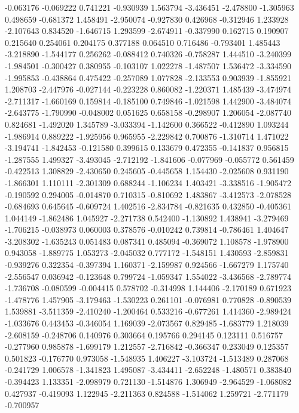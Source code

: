 -0.063176
-0.069222
0.741221
-0.930939
1.563794
-3.436451
-2.478800
-1.305963
0.498659
-0.681372
1.458491
-2.950074
-0.927830
0.426968
-0.312946
1.233928
-2.107643
0.834520
-1.646715
1.293599
-2.674911
-0.337990
0.162715
0.190907
0.215640
0.254061
0.204175
0.377188
0.064510
0.716486
-0.793401
1.485443
-3.218890
-1.544177
0.256262
-0.088412
0.740326
-0.758287
1.444510
-3.240399
-1.984501
-0.300427
0.380955
-0.103107
1.022278
-1.487507
1.536472
-3.334590
-1.995853
-0.438864
0.475422
-0.257089
1.077828
-2.133553
0.903939
-1.855921
1.208703
-2.447976
-0.027144
-0.223228
0.860082
-1.220371
1.485439
-3.474974
-2.711317
-1.660169
0.159814
-0.185100
0.749846
-1.021598
1.442900
-3.484074
-2.643775
-1.790990
-0.048002
0.051625
0.658158
-0.298907
1.206054
-2.087740
0.824681
-1.492020
1.345789
-3.033394
-1.142600
0.366522
-0.412890
1.093244
-1.986914
0.889222
-1.925956
0.965955
-2.229842
0.700876
-1.310714
1.471022
-3.194741
-1.842453
-0.121580
0.399615
0.133679
0.472355
-0.141837
0.956815
-1.287555
1.499327
-3.493045
-2.712192
-1.841606
-0.077969
-0.055772
0.561459
-0.422513
1.308829
-2.430650
0.245605
-0.445658
1.154430
-2.025608
0.931190
-1.866301
1.110111
-2.301309
0.688244
-1.106234
1.403421
-3.338516
-1.905472
-0.190592
0.294005
-0.014870
0.710315
-0.810692
1.483867
-3.412573
-2.078528
-0.684693
0.645645
-0.609724
1.402516
-2.834784
-0.821635
0.432850
-0.405361
1.044149
-1.862486
1.045927
-2.271738
0.542400
-1.130892
1.438941
-3.279469
-1.706215
-0.038973
0.060003
0.378576
-0.010242
0.739814
-0.786461
1.404647
-3.208302
-1.635243
0.051483
0.087341
0.485094
-0.369072
1.108578
-1.978900
0.943058
-1.889775
1.053273
-2.045032
0.777172
-1.548151
1.430593
-2.859831
-0.939276
0.322354
-0.397394
1.160371
-2.159987
0.924566
-1.667279
1.175740
-2.556547
0.036942
-0.123648
0.799724
-1.059347
1.554022
-3.436568
-2.789774
-1.736708
-0.080599
-0.004415
0.578702
-0.314998
1.144406
-2.170189
0.671923
-1.478776
1.457905
-3.179463
-1.530223
0.261101
-0.076981
0.770828
-0.890539
1.539881
-3.511359
-2.410240
-1.200464
0.533216
-0.677261
1.414360
-2.989424
-1.033676
0.443453
-0.346054
1.169039
-2.073567
0.829485
-1.683779
1.218039
-2.608159
-0.248706
0.140976
0.303664
0.195766
0.294145
0.123111
0.516757
-0.277960
0.985878
-1.699179
1.212557
-2.716842
-0.366347
0.233049
0.125357
0.501823
-0.176770
0.973058
-1.548935
1.406227
-3.103724
-1.513489
0.287068
-0.241729
1.006578
-1.341823
1.495087
-3.434411
-2.652248
-1.480571
0.383840
-0.394423
1.133351
-2.098979
0.721130
-1.514876
1.306949
-2.964529
-1.068082
0.427937
-0.419093
1.122945
-2.211363
0.824588
-1.514062
1.259721
-2.771179
-0.700957
